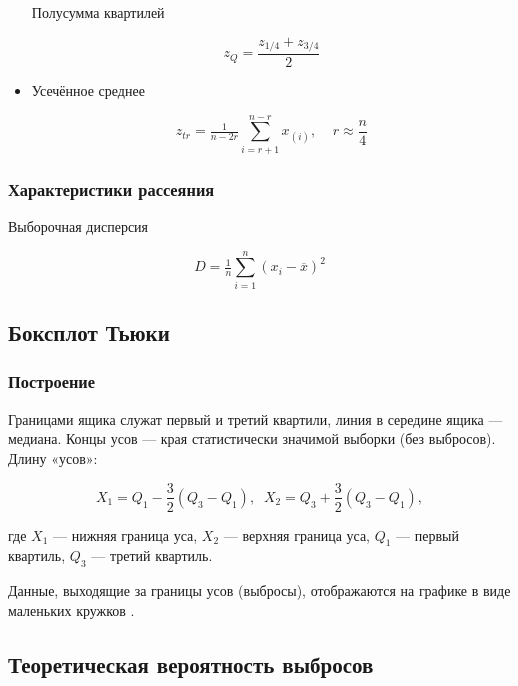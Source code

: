 \documentclass{article}
\begin{document}
\begin{itemize}
  Полусумма квартилей
  
  \begin{equation} \label{eq:zQ}
    z_Q = \dfrac{z_{1/4} + z_{3/4}}{2}
  \end{equation}
  
  \item Усечённое среднее
  
  \begin{equation} \label{eq:zTr}
    z_{tr} = \tfrac{1}{n-2r}\sum\limits_{i=r+1}^{n-r} x_{(i)}, \;\;\;\; r \approx \dfrac{n}{4}
  \end{equation}
  
\end{itemize}

\subsubsection{Характеристики рассеяния}

Выборочная дисперсия

\begin{equation}
    D = \tfrac{1}{n}\sum\limits_{i=1}^{n} (x_i - \overline{x})^2
\end{equation}

\subsection{Боксплот Тьюки}

\subsubsection{Построение}

Границами ящика служат первый и третий квартили, линия в середине ящика --- медиана. Концы усов --- края статистически значимой выборки (без выбросов). Длину «усов»:

\begin{equation} \label{eq:boundBoxplot}
    X_1 = Q_1 - \dfrac{3}{2}(Q_3 - Q_1), \;\; X_2 = Q_3 + \dfrac{3}{2}(Q_3 - Q_1),
\end{equation}

где $X_1$ --- нижняя граница уса, $X_2$ --- верхняя граница уса, $Q_1$ --- первый квартиль, $Q_3$ --- третий квартиль.

Данные, выходящие за границы усов (выбросы), отображаются на графике в виде маленьких кружков .

\subsection{Теоретическая вероятность выбросов}
\end{document}
